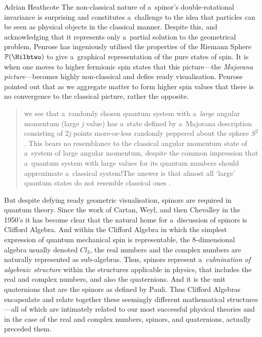 \begin{artengenv}{Adrian Heathcote}
The non-classical nature of a~spinor's double-rotational invariance is surprising and constitutes a~challenge to the idea that particles can be seen as physical objects in the classical manner. Despite this, and acknowledging that it represents only a~partial solution to the geometrical problem, Penrose has ingeniously utilised the properties of the Riemann Sphere $\mathbb{P}(\Hilbtwo)$ to give a~graphical representation of the pure states of spin. It is when one moves to higher fermionic spin states that this picture---the \textit{Majorana picture}---becomes highly non-classical and defies ready visualisation. Penrose pointed out that as we aggregate matter to form higher spin values that  there is no convergence to the classical picture, rather the opposite. 
\begin{quotation}\noindent
\xelip we see that a~randomly chosen quantum system with a~\textit{large} angular momentum (large \textit{j} value) has a~state defined by a~Majorana description consisting of 2\textit{j} points more-or-less randomly peppered about the sphere $S^{2}$. This bears no resemblance to the classical angular momentum state of a~system of large angular momentum, despite the common impression that a~quantum system with large values for its quantum numbers should approximate a~classical system!\xelip The answer is that almost all `large' quantum states do not resemble classical ones \parencites[566]{penrose_road_2004_ah}[also see][]{penrose_spinors_1987}{penrose_spinors_1988}.
\end{quotation}

But despite defying ready geometric visualisation, spinors are required in quantum theory. Since the work of Cartan, Weyl, and then Chevalley in the 1950's it has become clear that the natural home for a~discussion of spinors is Clifford Algebra. And within the Clifford Algebra in which the simplest expression of quantum mechanical spin is representable, the 8-dimensional algebra usually denoted $\mathit{Cl}_{3}$, the real numbers and the complex numbers are naturally represented as sub-algebras. Thus, spinors represent a~\textit{culmination of algebraic structure} within the structures applicable in physics, that includes the real and complex numbers, and also the quaternions. And it is the unit quaternions that are the spinors as defined by Pauli. Thus Clifford Algebras encapsulate and relate together these seemingly different mathematical structures---all of which are intimately related to our most successful physical theories and in the case of the real and  complex numbers, spinors, and quaternions, actually preceded them.


\end{artengenv}
